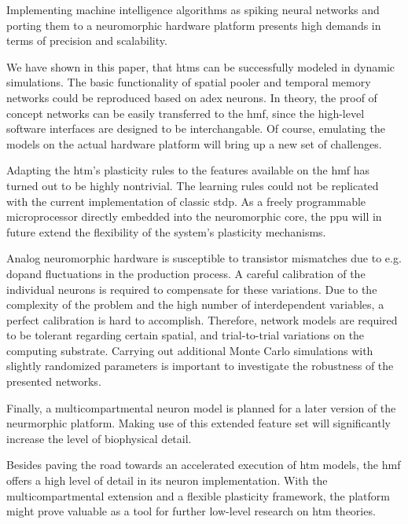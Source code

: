 Implementing machine intelligence algorithms as spiking neural networks and porting them to a neuromorphic hardware platform presents high demands in terms of precision and scalability.

We have shown in this paper, that \glspl{htm} can be successfully modeled in dynamic simulations. The basic functionality of spatial pooler and temporal memory networks could be reproduced based on \gls{adex} neurons. In theory, the proof of concept networks can be easily transferred to the \gls{hmf}, since the high-level software interfaces are designed to be interchangable. Of course, emulating the models on the actual hardware platform will bring up a new set of challenges.

Adapting the \gls{htm}'s plasticity rules to the features available on the \gls{hmf} has turned out to be highly nontrivial. The learning rules could not be replicated with the current implementation of classic \gls{stdp}. As a freely programmable microprocessor directly embedded into the neuromorphic core, the \gls{ppu} will in future extend the flexibility of the system's plasticity mechanisms.

Analog neuromorphic hardware is susceptible to transistor mismatches due to e.g. dopand fluctuations in the production process. A careful calibration of the individual neurons is required to compensate for these variations. Due to the complexity of the problem and the high number of interdependent variables, a perfect calibration is hard to accomplish. Therefore, network models are required to be tolerant regarding certain spatial, and trial-to-trial variations on the computing substrate. Carrying out additional Monte Carlo simulations with slightly randomized parameters is important to investigate the robustness of the presented networks.

Finally, a multicompartmental neuron model is planned for a later version of the neurmorphic platform. Making use of this extended feature set will significantly increase the level of biophysical detail. 

Besides paving the road towards an accelerated execution of \gls{htm} models, the \gls{hmf} offers a high level of detail in its neuron implementation. With the multicompartmental extension and a flexible plasticity framework, the platform might prove valuable as a tool for further low-level research on \gls{htm} theories.
